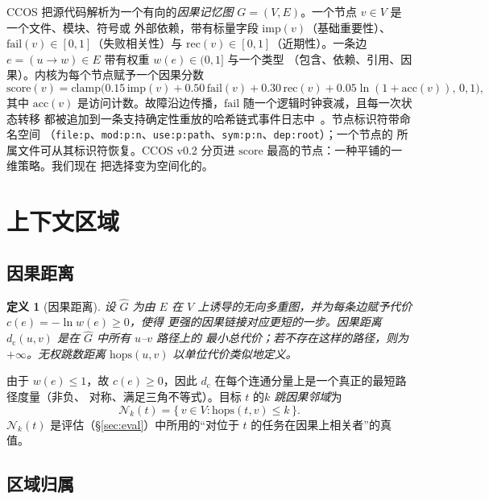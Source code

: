 \documentclass[11pt]{ctexart}
\newtheorem{definition}{定义}
\newcommand{\dcausal}{d_{\mathrm{c}}}
\newcommand{\Nk}{\mathcal{N}_k}
\newcommand{\code}[1]{\texttt{#1}}
\begin{document}
CCOS 把源代码解析为一个有向的\emph{因果记忆图} $G=(V,E)$。一个节点 $v\in V$ 是一个文件、模块、符号或
外部依赖，带有标量字段 $\mathrm{imp}(v)$（基础重要性）、$\mathrm{fail}(v)\in[0,1]$（失败相关性）与
$\mathrm{rec}(v)\in[0,1]$（近期性）。一条边 $e=(u\!\to\!w)\in E$ 带有权重 $w(e)\in(0,1]$ 与一个类型
（包含、依赖、引用、因果）。内核为每个节点赋予一个因果分数
\begin{equation}
\mathrm{score}(v) = \mathrm{clamp}\big(0.15\,\mathrm{imp}(v) + 0.50\,\mathrm{fail}(v)
  + 0.30\,\mathrm{rec}(v) + 0.05\ln(1{+}\mathrm{acc}(v)),\,0,1\big),
\label{eq:score}
\end{equation}
其中 $\mathrm{acc}(v)$ 是访问计数。故障沿边传播，$\mathrm{fail}$ 随一个逻辑时钟衰减，且每一次状态转移
都被追加到一条支持确定性重放的哈希链式事件日志中~\cite{haber1991timestamp}。节点标识符带命名空间
（\code{file:p}、\code{mod:p:n}、\code{use:p:path}、\code{sym:p:n}、\code{dep:root}）；一个节点的
所属文件可从其标识符恢复。CCOS v0.2 分页进 $\mathrm{score}$ 最高的节点：一种平铺的一维策略。我们现在
把选择变为空间化的。

\section{上下文区域}\label{sec:regions}

\subsection{因果距离}

\begin{definition}[因果距离]
设 $\hat G$ 为由 $E$ 在 $V$ 上诱导的无向多重图，并为每条边赋予代价 $c(e) = -\ln w(e) \ge 0$，使得
更强的因果链接对应更短的一步。\emph{因果距离} $\dcausal(u,v)$ 是在 $\hat G$ 中所有 $u$--$v$ 路径上的
最小总代价；若不存在这样的路径，则为 $+\infty$。无权跳数距离 $\mathrm{hops}(u,v)$ 以单位代价类似地定义。
\end{definition}

由于 $w(e)\le 1$，故 $c(e)\ge 0$，因此 $\dcausal$ 在每个连通分量上是一个真正的最短路径度量（非负、
对称、满足三角不等式）。目标 $t$ 的\emph{$k$ 跳因果邻域}为
\begin{equation}
\Nk(t) = \{\, v \in V : \mathrm{hops}(t,v) \le k \,\}.
\end{equation}
$\Nk(t)$ 是评估（\S\ref{sec:eval}）中所用的“对位于 $t$ 的任务在因果上相关者”的真值。

\subsection{区域归属}
\end{document}
